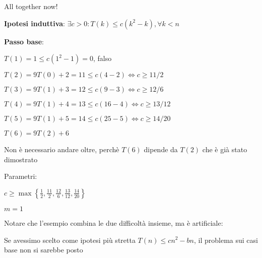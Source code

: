 \begin{frame}{All together now!}
\begin{overprint}

\BIL
\item {\bf Ipotesi induttiva}: \alert{$\exists c>0: T(k) \leq c(k^2-k), \forall k < n$}
\item {\bf Passo base}:
\BI
 \item $T(1) = 1 \leq c(1^2-1) = 0$, falso
 \item $T(2) = 9T(0)+ 2 = 11 \leq c(4-2) \Leftrightarrow c \geq 11/2$
 \item $T(3) = 9T(1)+ 3 = 12 \leq c(9-3) \Leftrightarrow c \geq 12/6$
 \item $T(4) = 9T(1)+ 4 = 13 \leq c(16-4) \Leftrightarrow c \geq 13/12$
 \item $T(5) = 9T(1)+ 5 = 14 \leq c(25-5) \Leftrightarrow c \geq 14/20$
 \item $T(6) = 9T(2)+ 6$
\EI
\item Non è necessario andare oltre, perchè $T(6)$ dipende da $T(2)$ che è già 
stato dimostrato
\EIL
	
	
\BIL
\item Parametri:
\BI
\item $c \geq \max \left\{ \frac{1}{2}, \frac{11}{2}, \frac{12}{6}, \frac{13}{12}, \frac{14}{20} \right\}$	
\item $m=1$
\EI
\item Notare che l'esempio combina le due difficoltà insieme, ma è artificiale:
\BI
\item Se avessimo scelto come ipotesi più stretta \alert{$T(n) \leq cn^2 - bn$}, il
problema sui casi base non si sarebbe posto
\EI
\EIL	

\end{overprint}
	
\end{frame}







